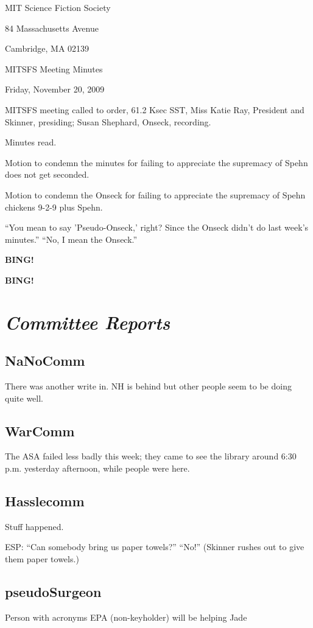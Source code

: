\documentclass[10pt]{article}
\newcommand{\bing}{{\bf BING!} }
\newcommand{\goto}[1]{\bing \vskip 12pt \section*{{\em{#1}}}}
\newcommand{\ps}{ plus Spehn\xspace}
\newcommand{\skinner}{Miss Katie Ray, President and Skinner}
\newcommand{\onseck}{Susan Shephard, Onseck}
\newcommand{\meetingdate}{Friday, November 20, 2009}
\begin{document}
\begin{center}

MIT Science Fiction Society

84 Massachusetts Avenue

Cambridge, MA 02139

\vspace{12pt}

MITSFS Meeting Minutes

\meetingdate

\end{center}

\vspace{18pt}

\setlength{\parskip}{6pt}

\noindent
MITSFS meeting called to order, 61.2 Ksec SST,
\skinner, presiding; \onseck, recording.

Minutes read.

Motion to condemn the minutes for failing to appreciate the supremacy of Spehn does not get seconded.

Motion to condemn the Onseck for failing to appreciate the supremacy of Spehn chickens 9-2-9\ps.

``You mean to say 'Pseudo-Onseck,' right? Since the Onseck didn't do last week's minutes.''
``No, I mean the Onseck.''

\bing

\goto{Committee Reports}

\subsection*{NaNoComm}
There was another write in. NH is behind but other people seem to be doing quite well.

\subsection*{WarComm}
The ASA failed less badly this week; they came to see the library around 6:30 p.m. yesterday afternoon, while people were here.

\subsection*{Hasslecomm}
Stuff happened.

ESP: ``Can somebody bring us paper towels?''
``No!''
(Skinner rushes out to give them paper towels.)

\subsection*{pseudoSurgeon}
Person with acronyms EPA (non-keyholder) will be helping Jade 
\end{document}
